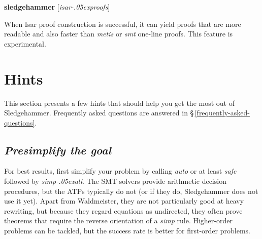\documentclass[a4paper,12pt]{article}
\let\oldS=\S
\def\S{\oldS\,}
\renewcommand\_{\hbox{\textunderscore\kern-.05ex}}
\begin{document}
\prew
\textbf{sledgehammer} [\textit{isar\_proofs}]
\postw

When Isar proof construction is successful, it can yield proofs that are more
readable and also faster than \textit{metis} or \textit{smt} one-line
proofs. This feature is experimental.

%
%
%
%
%

\section{Hints}
\label{hints}

This section presents a few hints that should help you get the most out of
Sledgehammer. Frequently asked questions are answered in
\S\ref{frequently-asked-questions}.

\newcommand\point[1]{\subsection{\slshape #1}}


\point{Presimplify the goal}

For best results, first simplify your problem by calling \textit{auto} or at
least \textit{safe} followed by \textit{simp\_all}. The SMT solvers provide
arithmetic decision procedures, but the ATPs typically do not (or if they do,
Sledgehammer does not use it yet). Apart from Waldmeister, they are not
particularly good at heavy rewriting, but because they regard equations as
undirected, they often prove theorems that require the reverse orientation of a
\textit{simp} rule. Higher-order problems can be tackled, but the success rate
is better for first-order problems.
\end{document}
